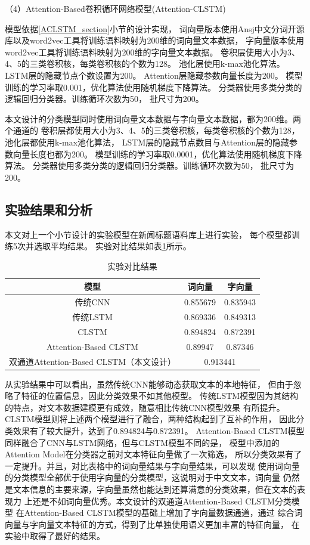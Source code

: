 （4）Attention-Based卷积循环网络模型(Attention-CLSTM)

模型依据\ref{ACLSTM_section}小节的设计实现，
词向量版本使用Ansj中文分词开源库以及word2vec工具将训练语料映射为200维的词向量文本数据，
字向量版本使用word2vec工具将训练语料映射为200维的字向量文本数据。
卷积层使用大小为3、4、5的三类卷积核，每类卷积核的个数为128。
池化层使用k-max池化算法。
LSTM层的隐藏节点个数设置为200。
Attention层隐藏参数向量长度为200。
模型训练的学习率取0.001，优化算法使用随机梯度下降算法。
分类器使用多类分类的逻辑回归分类器。训练循环次数为50，
批尺寸为200。

本文设计的分类模型同时使用词向量文本数据与字向量文本数据，都为200维。两个通道的
卷积层都使用大小为3、4、5的三类卷积核，每类卷积核的个数为128，池化层都使用k-max池化算法，
LSTM层的隐藏节点数目与Attention层的隐藏参数向量长度也都为200。
模型训练的学习率取0.0001，优化算法使用随机梯度下降算法。
分类器使用多类分类的逻辑回归分类器。训练循环次数为50，
批尺寸为200。
\subsection{实验结果和分析}
本文对上一个小节设计的实验模型在新闻标题语料库上进行实验，
每个模型都训练5次并选取平均结果。
实验对比结果如表\ref{classification_result_table}所示。
\begin{table}[h]
    \caption{实验对比结果}
    \begin{tabular}{|c|c|c|}
        \hline
        模型 & 词向量 & 字向量 \\
        \hline
        传统CNN & 0.855679 & 0.835943 \\
        \hline
        传统LSTM & 0.869336 & 0.849313 \\
        \hline
        CLSTM & 0.894824 & 0.872391 \\
        \hline
        Attention-Based CLSTM & 0.89947 & 0.87346 \\
        \hline
        双通道Attention-Based CLSTM（本文设计） & \multicolumn{2}{|c|}{0.913441} \\
        \hline
    \end{tabular}
    \label{classification_result_table}
\end{table}

从实验结果中可以看出，虽然传统CNN能够动态获取文本的本地特征，
但由于忽略了特征的位置信息，因此分类效果不如其他模型。
传统LSTM模型因为其结构的特点，对文本数据建模更有成效，随意相比传统CNN模型效果
有所提升。CLSTM模型则将上述两个模型进行了融合，两种结构起到了互补的作用，
因此分类效果有了较大提升，达到了0.894824与0.872391。
Attention-Based CLSTM模型同样融合了CNN与LSTM网络，但与CLSTM模型不同的是，
模型中添加的Attention Model在分类器之前对文本特征向量做了一次筛选，
所以分类效果有了一定提升。并且，对比表格中的词向量结果与字向量结果，可以发现
使用词向量的分类模型全部优于使用字向量的分类模型，这说明对于中文文本，词向量
仍然是文本信息的主要来源，字向量虽然也能达到还算满意的分类效果，但在文本的表现力
上还是不如词向量优秀。本文设计的双通道Attention-Based CLSTM分类模型
在Attention-Based CLSTM模型的基础上增加了字向量数据通道，通过
综合词向量与字向量文本特征的方式，得到了比单独使用语义更加丰富的特征向量，
在实验中取得了最好的结果。

